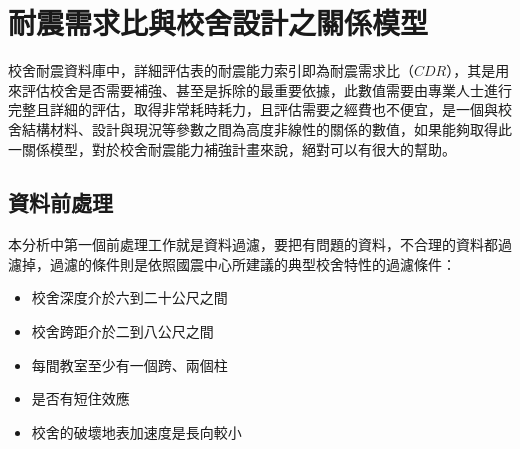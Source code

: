 \section{耐震需求比與校舍設計之關係模型}

校舍耐震資料庫中，詳細評估表的耐震能力索引即為耐震需求比（$CDR$），其是用來評估校舍是否需要補強、甚至是拆除的最重要依據，此數值需要由專業人士進行完整且詳細的評估，取得非常耗時耗力，且評估需要之經費也不便宜，是一個與校舍結構材料、設計與現況等參數之間為高度非線性的關係的數值，如果能夠取得此一關係模型，對於校舍耐震能力補強計畫來說，絕對可以有很大的幫助。

\subsection{資料前處理}

本分析中第一個前處理工作就是資料過濾，要把有問題的資料，不合理的資料都過濾掉，過濾的條件則是依照國震中心所建議的典型校舍特性的過濾條件：


\begin{itemize}
\item 校舍深度介於六到二十公尺之間
\item 校舍跨距介於二到八公尺之間
\item 每間教室至少有一個跨、兩個柱
\item 是否有短住效應 %
\item 校舍的破壞地表加速度是長向較小
\end{itemize}


